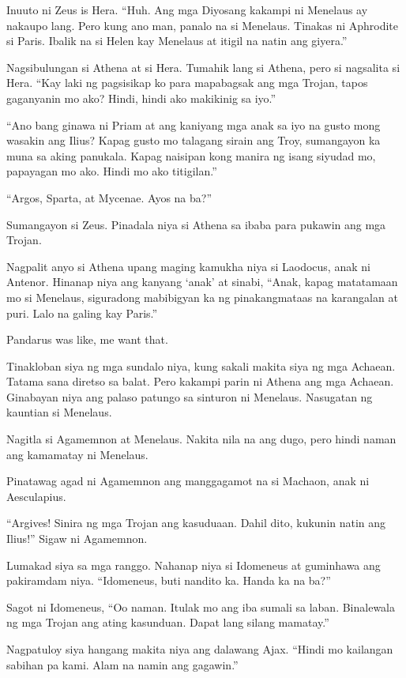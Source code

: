 \documentclass[12pt,letterpaper]{report}
\begin{document}
Inuuto ni Zeus is Hera. ``Huh. Ang mga Diyosang kakampi ni Menelaus ay nakaupo lang. Pero kung ano man, panalo na si Menelaus. Tinakas ni Aphrodite si Paris. Ibalik na si Helen kay Menelaus at itigil na natin ang giyera.''

Nagsibulungan si Athena at si Hera. Tumahik lang si Athena, pero si nagsalita si Hera. ``Kay laki ng pagsisikap ko para mapabagsak ang mga Trojan, tapos gaganyanin mo ako? Hindi, hindi ako makikinig sa iyo.''

``Ano bang ginawa ni Priam at ang kaniyang mga anak sa iyo na gusto mong wasakin ang Ilius? Kapag gusto mo talagang sirain ang Troy, sumangayon ka muna sa aking panukala. Kapag naisipan kong manira ng isang siyudad mo, papayagan mo ako. Hindi mo ako titigilan.''

``Argos, Sparta, at Mycenae. Ayos na ba?''

Sumangayon si Zeus. Pinadala niya si Athena sa ibaba para pukawin ang mga Trojan.

Nagpalit anyo si Athena upang maging kamukha niya si Laodocus, anak ni Antenor. Hinanap niya ang kanyang `anak' at sinabi, ``Anak, kapag matatamaan mo si Menelaus, siguradong mabibigyan ka ng pinakangmataas na karangalan at puri. Lalo na galing kay Paris.''

Pandarus was like, me want that.

Tinakloban siya ng mga sundalo niya, kung sakali makita siya ng mga Achaean. Tatama sana diretso sa balat. Pero kakampi parin ni Athena ang mga Achaean. Ginabayan niya ang palaso patungo sa sinturon ni Menelaus. Nasugatan ng kauntian si Menelaus.

Nagitla si Agamemnon at Menelaus. Nakita nila na ang dugo, pero hindi naman ang kamamatay ni Menelaus.

Pinatawag agad ni Agamemnon ang manggagamot na si Machaon, anak ni Aesculapius.

``Argives! Sinira ng mga Trojan ang kasuduaan. Dahil dito, kukunin natin ang Ilius!'' Sigaw ni Agamemnon.

Lumakad siya sa mga ranggo. Nahanap niya si Idomeneus at guminhawa ang pakiramdam niya. ``Idomeneus, buti nandito ka. Handa ka na ba?''

Sagot ni Idomeneus, ``Oo naman. Itulak mo ang iba sumali sa laban. Binalewala ng mga Trojan ang ating kasunduan. Dapat lang silang mamatay.''

Nagpatuloy siya hangang makita niya ang dalawang Ajax. ``Hindi mo kailangan sabihan pa kami. Alam na namin ang gagawin.''
\end{document}
